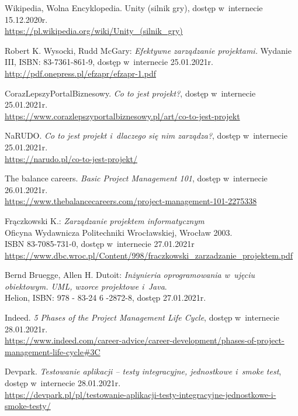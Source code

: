 \documentclass[oneside,polski,logo]{amuthesis}
\begin{document}
\begin{thebibliography}{100} 

\addtolength{\leftmargin}{0.2in} 
\setlength{\itemindent}{-0.2in}

Wikipedia, Wolna Encyklopedia. Unity (silnik gry), dostęp w~internecie 15.12.2020r.\\
\url{https://pl.wikipedia.org/wiki/Unity\_(silnik\_gry)}

Robert K. Wysocki, Rudd McGary: \emph{Efektywne zarządzanie projektami.} Wydanie III, ISBN: 83-7361-861-9, dostęp w~internecie 25.01.2021r.\\
\url{http://pdf.onepress.pl/efzapr/efzapr-1.pdf}

CorazLepszyPortalBiznesowy. \emph{Co to jest projekt?}, dostęp w~internecie 25.01.2021r.\\
\url{https://www.corazlepszyportalbiznesowy.pl/art/co-to-jest-projekt}

NaRUDO. \emph{Co to jest projekt i~dlaczego się nim zarządza?}, dostęp w~internecie 25.01.2021r.\\
\url{https://narudo.pl/co-to-jest-projekt/}

The balance careers. \emph{Basic Project Management 101}, dostęp w~internecie 26.01.2021r.\\
\url{https://www.thebalancecareers.com/project-management-101-2275338}

Frączkowski K.: \emph{Zarządzanie projektem informatycznym}\\
Oficyna Wydawnicza Politechniki Wrocławskiej, Wrocław 2003.\\
ISBN 83-7085-731-0, dostęp w~internecie 27.01.2021r\\
\url{https://www.dbc.wroc.pl/Content/998/fraczkowski\_zarzadzanie\_projektem.pdf}

Bernd Bruegge, Allen H. Dutoit: \emph{Inżynieria oprogramowania w~ujęciu obiektowym. UML, wzorce projektowe i~Java}.\\
Helion, ISBN: 978 - 83-24 6 -2872-8, dostęp 27.01.2021r.

Indeed. \emph{5 Phases of the Project Management Life Cycle}, dostęp w~internecie 28.01.2021r.\\
\url{https://www.indeed.com/career-advice/career-development/phases-of-project-management-life-cycle\#3C}

Devpark. \emph{Testowanie aplikacji – testy integracyjne, jednostkowe i~smoke test}, dostęp w~internecie 28.01.2021r.\\
\url{https://devpark.pl/pl/testowanie-aplikacji-testy-integracyjne-jednostkowe-i-smoke-testy/}


\end{thebibliography}
\end{document}
